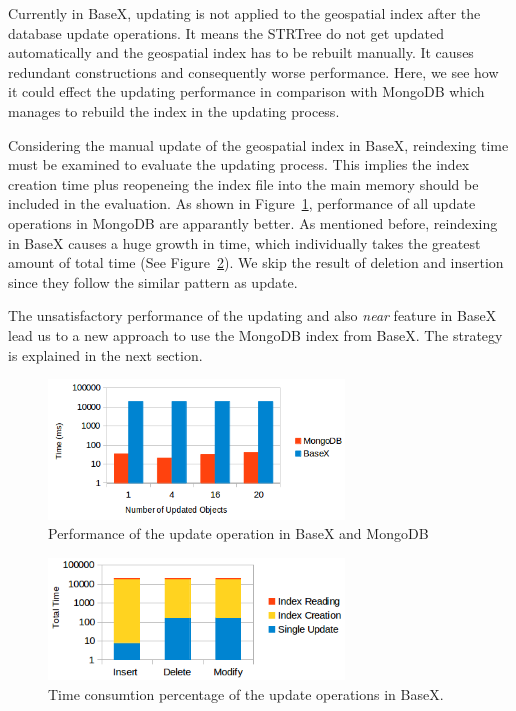 \documentclass[a4paper,12pt]{article}
\begin{document}
Currently in BaseX, updating is not applied to the geospatial index after the database update operations. It means the STRTree do not get updated automatically and the geospatial index has to be rebuilt manually. It causes redundant constructions and consequently worse performance. Here, we see how it could effect the updating performance in comparison with MongoDB which manages to rebuild the index in the updating process.

Considering the manual update of the geospatial index in BaseX, reindexing time must be examined to evaluate the updating process. This implies the index creation time plus reopeneing the index file into the main memory should be included in the evaluation. 
As shown in Figure~\ref{figBXvsMongoUpdate}, performance of all update operations in MongoDB are apparantly better. As mentioned before, reindexing in BaseX causes a huge growth in time, which individually takes the greatest amount of total time (See Figure~\ref{figBXUpdate}). We skip the result of deletion and insertion since they follow the similar pattern as update.

The unsatisfactory performance of the updating and also \textit{near} feature in BaseX lead us to a new approach to use the MongoDB index from BaseX. The strategy is explained in the next section.

 


\begin{figure}
\centering
\includegraphics[width=0.7\textwidth]{BXvsMongo-Update.png}
\caption{Performance of the update operation in BaseX and MongoDB}
\label{figBXvsMongoUpdate}
\end{figure}


\begin{figure}
\centering
\includegraphics[width=0.7\textwidth]{BXUpdate.png}
\caption{Time consumtion percentage of the update operations in BaseX.}
\label{figBXUpdate}
\end{figure}
\end{document}
